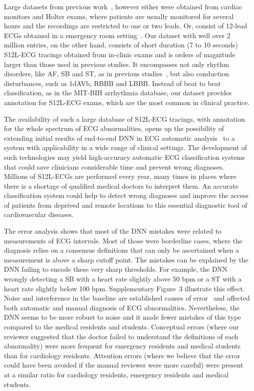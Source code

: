 \documentclass{article}
\begin{document}
Large datasets from previous work~\cite{shashikumar_detection_2018, clifford_af_2017, hannun_cardiologistlevel_2019}, however either were obtained from cardiac monitors and Holter exams, where patients are usually monitored for several hours and the recordings are restricted to one or two leads. Or, consist of 12-lead ECGs obtained in a emergency room setting~\cite{goto_artificial_2019, smith_deep_2019}. Our dataset with well over 2 million entries, on the other hand, consists of short duration (7 to 10 seconds) S12L-ECG tracings obtained from in-clinic exams and is orders of magnitude larger than those used in previous studies. It encompasses not only rhythm disorders, like AF, SB and ST, as in previous studies~\cite{hannun_cardiologistlevel_2019}, but also conduction disturbances, such as 1dAVb, RBBB and LBBB. Instead of beat to beat classification, as in the MIT-BIH arrhythmia database, our dataset provides annotation for S12L-ECG exams, which are the most common in clinical practice. 


The availability of such a large database of S12L-ECG tracings, with annotation for the whole spectrum of ECG abnormalities, opens up the possibility of extending initial results of end-to-end DNN in ECG automatic analysis~\cite{hannun_cardiologistlevel_2019} to a system with applicability in a wide range of clinical settings. The development of such technologies may yield high-accuracy automatic ECG classification systems that could save clinicians considerable time and prevent wrong diagnoses. Millions of S12L-ECGs are performed every year, many times in places where there is a shortage of qualified medical doctors to interpret them. An accurate classification system could help to detect wrong diagnoses and improve the access of patients from deprived and remote locations to this essential diagnostic tool of cardiovascular diseases.

 
The error analysis shows that most of the DNN mistakes were related to measurements of ECG intervals. Most of those were borderline cases, where the diagnosis relies on a consensus definitions \cite{rautaharju_aha_2009} that can only be ascertained when a measurement is above a sharp cutoff point. The mistakes can be explained by the DNN failing to encode these very sharp thresholds. For example, the DNN wrongly detecting a SB with a heart rate slightly above 50 bpm or a ST with a heart rate slightly below 100 bpm. Supplementary Figure~3 illustrate this effect. Noise and interference in the baseline are established causes of error~\cite{luo_review_2010}  and affected both automatic and manual diagnosis of ECG abnormalities. Nevertheless, the DNN seems to be more robust to noise and it made fewer mistakes of this type compared to the medical residents and students. Conceptual errors (where our reviewer suggested that the doctor failed to understand the definitions of each abnormality) were more frequent for emergency residents and medical students than for cardiology residents. Attention errors (where we believe that the error could have been avoided if the manual reviewer were more careful) were present at a similar ratio for cardiology residents, emergency residents and medical students.
\end{document}
